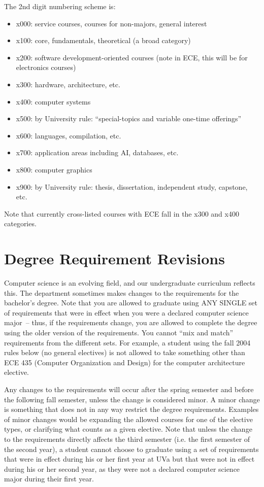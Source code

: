 \documentclass[10pt,letter]{book}
\newenvironment{itemlist}{
\begin{itemize}
\setlength{\itemsep}{0pt}
\setlength{\parskip}{0pt}}
{\end{itemize}}
\newcommand{\mysection}[1]{\section{#1}\renewcommand{\rightmark}{#1}}
\begin{document}
The 2nd digit numbering scheme is:

\begin{itemlist}
\item x000: service courses, courses for non-majors, general interest
\item x100: core, fundamentals, theoretical (a broad category)
\item x200: software development-oriented courses (note in ECE, this will
 be for electronics courses)
\item x300: hardware, architecture, etc.
\item x400: computer systems
\item x500: by University rule: ``special-topics and variable one-time
 offerings''
\item x600: languages, compilation, etc.
\item x700: application areas including AI, databases, etc.
\item x800: computer graphics
\item x900: by University rule: thesis, dissertation, independent
 study, capstone, etc.
\end{itemlist}

Note that currently cross-listed courses with ECE fall in the x300 and
x400 categories.

\mysection{Degree Requirement Revisions}
\label{sec:degreerevisions}

Computer science is an evolving field, and our undergraduate
curriculum reflects this. The department sometimes makes changes to
the requirements for the bachelor's degree. Note that you are allowed
to graduate using ANY SINGLE set of requirements that were in effect
when you were a declared computer science major~-- thus, if the
requirements change, you are allowed to complete the degree using the
older version of the requirements. You cannot ``mix and match''
requirements from the different sets. For example, a student using the
fall 2004 rules below (no general electives) is not allowed to take
something other than ECE 435 (Computer Organization and Design) for
the computer architecture elective. 

Any changes to the requirements will occur after the spring semester
and before the following fall semester, unless the change is
considered minor. A minor change is something that does not in any way
restrict the degree requirements. Examples of minor changes would be
expanding the allowed courses for one of the elective types, or
clarifying what counts as a given elective. Note that unless the
change to the requirements directly affects the third semester
(i.e. the first semester of the second year), a student cannot choose
to graduate using a set of requirements that were in effect during his
or her first year at UVa but that were not in effect during his or her
second year, as they were not a declared computer science major during
their first year.
\end{document}
